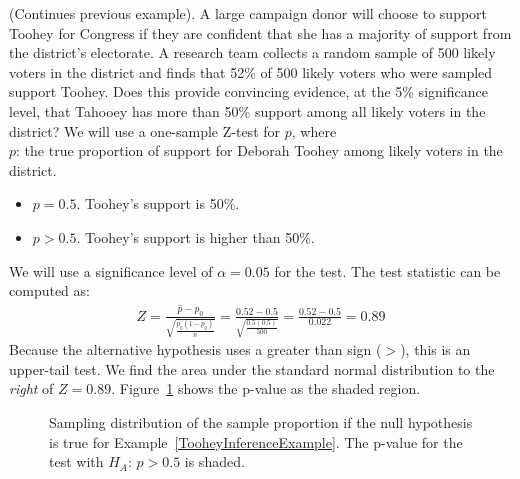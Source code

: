 \begin{examplewrap}
\begin{nexample}{(Continues previous example). A large campaign donor will choose to support Toohey for Congress if they are confident that she has a majority of support from the district's electorate.   A research team collects a random sample of 500 likely voters in the district and finds that 52\% of 500 likely voters who were sampled support Toohey. Does this provide convincing evidence, at the 5\% significance level, that Tahooey has more than 50\% support among all likely voters in the district?}\label{TooheyInferenceExample}
We will use a one-sample Z-test for $p$, where\\
$p$:  the true proportion of support for Deborah Toohey among likely voters in the district.
\begin{itemize}
\item[$H_0$:] $p = 0.5$. Toohey's support is 50\%.
\item[$H_A$:] $p > 0.5$. Toohey's support is higher than 50\%.
\end{itemize}
We will use a significance level of $\alpha = 0.05$ for the test. 
The test statistic can be computed as:
\begin{align*}
Z = \frac{\hat{p} - p_0}{\sqrt{\frac{p_0(1-p_0)}{n}}} =\frac{0.52 - 0.5}{\sqrt{\frac{0.5(0.5)}{500}}}= \frac{0.52 - 0.5}{0.022} = 0.89
\end{align*}
Because the alternative hypothesis uses a greater than sign ($>$), this is an upper-tail test.  We find the area under the standard normal distribution to the \emph{right} of $Z=0.89$.  Figure~\ref{pValueForCampaignManagerClaimOfMoreThan50PercentSupport} shows the p-value as the shaded region. 
\end{nexample}
\end{examplewrap}


\begin{figure}[h]
\centering
{}
\caption{Sampling distribution of the sample proportion if the null hypothesis is true for Example~\ref{TooheyInferenceExample}. The p-value for the test with $H_A$: $p > 0.5$ is shaded.}
\label{pValueForCampaignManagerClaimOfMoreThan50PercentSupport}
\end{figure}

